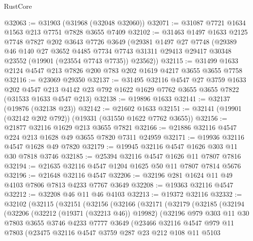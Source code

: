 \begin{lexlean}{RustCore}
\begin{coremodule}
@32063 := @31903 (@31968 (@32048 @32060))
@32071 := @31087 @7721 @1634 @1563 @213 @7751 @7828 @3655 @7409
@32102 := @31463
    @1497
    @1633
    @2125
    @7748
    @7827
    @202
    @3643
    @7726
    @3649
    (@29381
      @1497
      @27
      @7748
      (@29389
        @46
        @140
        @27
        @3652
        @4485
        @7734
        @7743
        @31311
        @29413
        @29417
        @30348
        @23552
        (@19901 (@23554 @7743 @7735))
        @23562))
@32115 := @31499 @1633 @2124 @4547 @213 @7826 @200 @783 @202 @1619 @4217 @3655 @3655 @7758
@32116 := @23069 @29350
@32137 := @31495
    @32116
    @4547
    @27
    @3759
    @1633
    @202
    @4547
    @213
    @4142
    @23
    @792
    @1622
    @1629
    @7762
    @3655
    @3655
    @7822
    (@31533 @1633 @4547 @213)
@32138 := @19896 @1633
@32141 := @32137 (@19876 (@32138 @23))
@32142 := @21602 @1633
@32151 := @32141 (@19901 (@32142 @202 @792)) (@19331 (@31550 @1622 @7762 @3655))
@32156 := @21877 @32116 @1629 @213 @3655 @7821
@32166 := @21886 @32116 @4547 @224 @213 @1628 @49 @3655 @7820 @7311 @24959
@32171 := @19936 @32116 @4547 @1628 @49 @7820
@32179 := @19945 @32116 @4547 @1626 @303 @11 @30 @7818 @3746
@32185 := @25394 @32116 @4547 @1626 @11 @7807 @7816
@32194 := @21635 @32116 @4547 @1204 @1625 @50 @11 @7807 @7814 @5676
@32196 := @21648 @32116 @4547
@32206 := @32196 @281 @1624 @11 @49 @4103 @7806 @7813 @4233 @7767 @3649
@32208 := @19363 @32116 @4547
@32212 := @32208 @46 @11 @46 @4103
@32213 := @19372 @32116
@32332 := @32102
    (@32115
      (@32151
        (@32156
          (@32166
            (@32171
              (@32179
                (@32185
                  (@32194
                    (@32206
                      (@32212 (@19371 (@32213 @46)) @19982)
                      (@32196
                        @979
                        @303
                        @11
                        @30
                        @7803
                        @3655
                        @3746
                        @4233
                        @7777
                        @3649
                        (@23466
                          @32116
                          @4547
                          @979
                          @11
                          @7803
                          (@23475
                            @32116
                            @4547
                            @3759
                            @287
                            @23
                            @212
                            @108
                            @11
                            @5103

\end{coremodule}
\end{lexlean}
